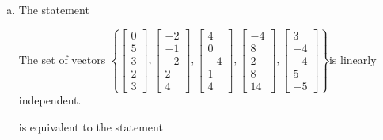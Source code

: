 \begin{exerciseAnswer}
\begin{enumerate}[(a)]
\item The statement 
\begin{center}\begin{minipage}{0.8\textwidth}
 The set of vectors \( \left\{ \left[\begin{array}{c}
0 \\
5 \\
3 \\
2 \\
3
\end{array}\right] , \left[\begin{array}{c}
-2 \\
-1 \\
-2 \\
2 \\
4
\end{array}\right] , \left[\begin{array}{c}
4 \\
0 \\
-4 \\
1 \\
4
\end{array}\right] , \left[\begin{array}{c}
-4 \\
8 \\
2 \\
8 \\
14
\end{array}\right] , \left[\begin{array}{c}
3 \\
-4 \\
-4 \\
5 \\
-5
\end{array}\right] \right\} \)is linearly independent.
\end{minipage}\end{center}
     is equivalent to the statement 
\begin{center}\begin{minipage}{0.8\textwidth}
 The vector equation \( x_{1} \left[\begin{array}{c}
0 \\
5 \\
3 \\
2 \\
3
\end{array}\right] + x_{2} \left[\begin{array}{c}
-2 \\
-1 \\

\end{array}
\end{minipage}
\end{center}
\end{enumerate}
\end{exerciseAnswer}
